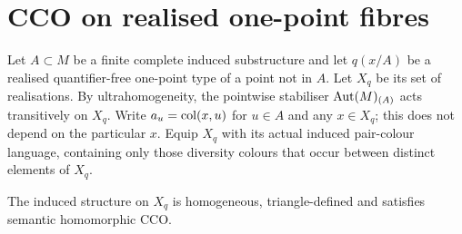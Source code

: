 \section{CCO on realised one-point fibres}
Let $A\subset M$ be a finite complete induced substructure and let
$q(x/A)$ be a realised quantifier-free one-point type of a point not in
$A$. Let $X_q$ be its set of realisations. By ultrahomogeneity, the
pointwise stabiliser $\operatorname{Aut}(M)_{(A)}$ acts transitively on $X_q$.
Write $a_u=\operatorname{col}(x,u)$ for $u\in A$ and any $x\in X_q$; this does not
depend on the particular $x$. Equip $X_q$ with its actual induced
pair-colour language, containing only those diversity colours that occur
between distinct elements of $X_q$.

\begin{lemma}\label{lem:fibreCCO}
The induced structure on $X_q$ is homogeneous, triangle-defined and
satisfies semantic homomorphic CCO.
\end{lemma}
